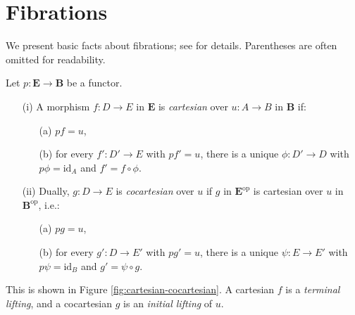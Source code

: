 \documentclass{article}
\begin{document}
\newpage
\section{Fibrations}
\label{sec:fibrations}

We present basic facts about fibrations; see \cite{Benabou1985, Giraud1971, Gray1966, Grothendieck1971} for details. Parentheses are often omitted for readability.

\begin{definition}
\label{def:2.1}
Let $p : \mathbf{E} \to \mathbf{B}$ be a functor.
\begin{enumerate}
    \item[(i)] A morphism $f : D \to E$ in $\mathbf{E}$ is \emph{cartesian} over $u : A \to B$ in $\mathbf{B}$ if:
        \begin{itemize}
            \item[(a)] $p f = u$,
            \item[(b)] for every $f' : D' \to E$ with $p f' = u$, there is a unique $\phi : D' \to D$ with $p \phi = \text{id}_A$ and $f' = f \circ \phi$.
        \end{itemize}
    \item[(ii)] Dually, $g : D \to E$ is \emph{cocartesian} over $u$ if $g$ in $\mathbf{E}^{\text{op}}$ is cartesian over $u$ in $\mathbf{B}^{\text{op}}$, i.e.:
        \begin{itemize}
            \item[(a)] $p g = u$,
            \item[(b)] for every $g' : D \to E'$ with $p g' = u$, there is a unique $\psi : E \to E'$ with $p \psi = \text{id}_B$ and $g' = \psi \circ g$.
        \end{itemize}
\end{enumerate}
This is shown in Figure \ref{fig:cartesian-cocartesian}. A cartesian $f$ is a \emph{terminal lifting}, and a cocartesian $g$ is an \emph{initial lifting} of $u$.
\begin{figure}[h]
    \centering
\end{figure}
\end{definition}
\end{document}
